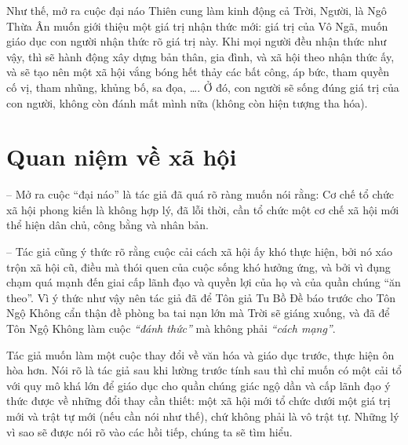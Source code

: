 Như thế, mở ra cuộc đại náo Thiên cung làm kinh động cả Trời, Người, là Ngô Thừa Ân muốn giới thiệu một giá trị nhận thức mới: giá trị của Vô Ngã, muốn giáo dục con người nhận thức rõ giá trị này. Khi mọi người đều nhận thức như vậy, thì sẽ hành động xây dựng bản thân, gia đình, và xã hội theo nhận thức ấy, và sẽ tạo nên một xã hội vắng bóng hết thảy các bất công, áp bức, tham quyền cố vị, tham nhũng, khủng bố, sa đọa, \ldots. Ở đó, con người sẽ sống đúng giá trị của con người, không còn đánh mất mình nữa (không còn hiện tượng tha hóa).


\section{Quan niệm về xã hội} %
\label{sec:4_xa_hoi}

-- Mở ra cuộc ``đại náo'' là tác giả đã quá rõ ràng muốn nói rằng: Cơ chế tổ chức xã hội phong kiến là không hợp lý, đã lỗi thời, cần tổ chức một cơ chế xã hội mới thể hiện dân chủ, công bằng và nhân bản.

-- Tác giả cũng ý thức rõ rằng cuộc cải cách xã hội ấy khó thực hiện, bởi nó xáo trộn xã hội cũ, điều mà thói quen của cuộc sống khó hưởng ứng, và bởi vì đụng chạm quá mạnh đến giai cấp lãnh đạo và quyền lợi của họ và của quần chúng ``ăn theo''. Vì ý thức như vậy nên tác giả đã để Tôn giả Tu Bồ Đề báo trước cho Tôn Ngộ Không cẩn thận đề phòng ba tai nạn lớn mà Trời sẽ giáng xuống, và đã để Tôn Ngộ Không làm cuộc \emph{``đánh thức''} mà không phải \emph{``cách mạng''}.

Tác giả muốn làm một cuộc thay đổi về văn hóa và giáo dục trước, thực hiện ôn hòa hơn. Nói rõ là tác giả sau khi lường trước tính sau thì chỉ muốn có một cải tổ với quy mô khá lớn để giáo dục cho quần chúng giác ngộ dần và cấp lãnh đạo ý thức được về những đổi thay cần thiết: một xã hội mới tổ chức dưới một giá trị mới và trật tự mới (nếu cần nói như thế), chứ không phải là vô trật tự. Những lý vì sao sẽ được nói rõ vào các hồi tiếp, chúng ta sẽ tìm hiểu.

